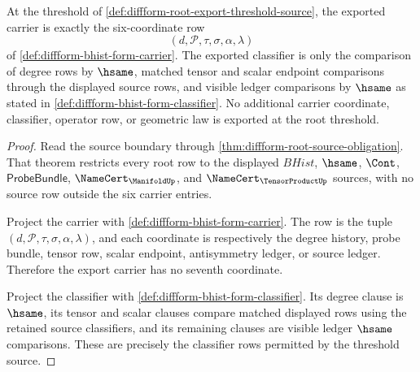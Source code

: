 \begin{theorem}
\label{thm:diffform-root-export-carrier-classifier-threshold}
At the threshold of \autoref{def:diffform-root-export-threshold-source}, the
exported carrier is exactly the six-coordinate row
$$
(d,\mathcal{P},\tau,\sigma,\alpha,\lambda)
$$
of \autoref{def:diffform-bhist-form-carrier}. The exported classifier is only
the comparison of degree rows by $\hsame$, matched tensor and scalar endpoint
comparisons through the displayed source rows, and visible ledger comparisons
by $\hsame$ as stated in \autoref{def:diffform-bhist-form-classifier}. No
additional carrier coordinate, classifier, operator row, or geometric law is
exported at the root threshold.
\end{theorem}
\begin{proof}
Read the source boundary through
\autoref{thm:diffform-root-source-obligation}. That theorem restricts every
root row to the displayed $BHist$, $\hsame$, $\Cont$,
$\mathsf{ProbeBundle}$, $\NameCert_{\ManifoldUp}$, and
$\NameCert_{\TensorProductUp}$ sources, with no source row outside the six
carrier entries.

Project the carrier with \autoref{def:diffform-bhist-form-carrier}. The row
is the tuple $(d,\mathcal{P},\tau,\sigma,\alpha,\lambda)$, and each coordinate
is respectively the degree history, probe bundle, tensor row, scalar endpoint,
antisymmetry ledger, or source ledger. Therefore the export carrier has no
seventh coordinate.

Project the classifier with
\autoref{def:diffform-bhist-form-classifier}. Its degree clause is $\hsame$,
its tensor and scalar clauses compare matched displayed rows using the
retained source classifiers, and its remaining clauses are visible ledger
$\hsame$ comparisons. These are precisely the classifier rows permitted by the
threshold source.
\end{proof}

